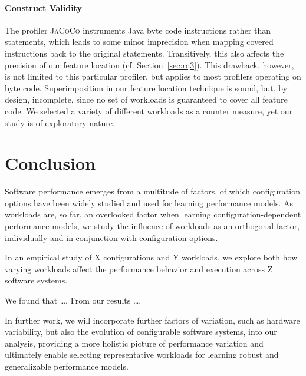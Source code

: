 \paragraph{Construct Validity}\label{sec:construct_validity}
The profiler \textsc{JaCoCo} instruments Java byte code instructions rather than statements, which leads to some minor imprecision when mapping covered instructions back to the original statements. Transitively, this also affects the precision of our feature location (cf. Section~\ref{sec:rq3}). This drawback, however, is not limited to this particular profiler, but applies to most profilers operating on byte code. 
Superimposition in our feature location technique is sound, but, by design, incomplete, since no set of workloads is guaranteed to cover all feature code. We selected a variety of different workloads as a counter measure, yet our study is of exploratory nature.

{\color{red} 
\section{Conclusion}

Software performance emerges from a multitude of factors, of which configuration options have been widely studied and used for learning performance models. As workloads are, so far, an overlooked factor when learning configuration-dependent performance models, we study the influence of workloads as an orthogonal factor, individually and in conjunction with configuration options. 

In an empirical study of X configurations and Y workloads, we explore both how varying workloads affect the performance behavior and execution across Z software systems. 

We found that \ldots. From our results \ldots.

In further work, we will incorporate further factors of variation, such as hardware variability, but also the evolution of configurable software systems, into our analysis, providing a more holistic picture of performance variation and ultimately enable selecting representative workloads for learning robust and generalizable performance models. 
}